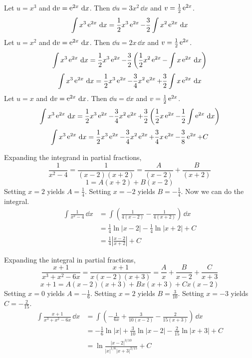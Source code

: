 \begin{Solution}
  \label{solution int x3 e2x}
  Let $u = x^3$ and $\mathrm{d} v = \mathop{\mathrm{e}}\nolimits^{2x}\,\mathrm{d} x$.  Then $\dd u = 3x^2 \,\dd x$ and
  $v = \frac{1}{2} \mathop{\mathrm{e}}\nolimits^{2x}$.
  \[
  \int x^3 \mathop{\mathrm{e}}\nolimits^{2x} \,\mathrm{d} x = \frac{1}{2} x^3 \mathop{\mathrm{e}}\nolimits^{2x} - \frac{3}{2} \int x^2 \mathop{\mathrm{e}}\nolimits^{2x}\,\mathrm{d} x
  \]
  Let $u = x^2$ and $\mathrm{d} v = \mathop{\mathrm{e}}\nolimits^{2x}\,\mathrm{d} x$.  Then $\dd u = 2x \,\dd x$ and
  $v = \frac{1}{2} \mathop{\mathrm{e}}\nolimits^{2x}$.
  \[
  \int x^3 \mathop{\mathrm{e}}\nolimits^{2x} \,\mathrm{d} x = \frac{1}{2} x^3 \mathop{\mathrm{e}}\nolimits^{2x} - \frac{3}{2} \left(
    \frac{1}{2} x^2 \mathop{\mathrm{e}}\nolimits^{2x} - \int x \mathop{\mathrm{e}}\nolimits^{2x} \,\mathrm{d} x \right)
  \]
  \[
  \int x^3 \mathop{\mathrm{e}}\nolimits^{2x} \,\mathrm{d} x = \frac{1}{2} x^3 \mathop{\mathrm{e}}\nolimits^{2x} - \frac{3}{4} x^2 \mathop{\mathrm{e}}\nolimits^{2x}
  + \frac{3}{2} \int x \mathop{\mathrm{e}}\nolimits^{2x} \,\mathrm{d} x
  \]
  Let $u = x$ and $\mathrm{d} v = \mathop{\mathrm{e}}\nolimits^{2x}\,\mathrm{d} x$.  Then $\dd u = \dd x$ and
  $v = \frac{1}{2} \mathop{\mathrm{e}}\nolimits^{2x}$.
  \[
  \int x^3 \mathop{\mathrm{e}}\nolimits^{2x} \,\mathrm{d} x = \frac{1}{2} x^3 \mathop{\mathrm{e}}\nolimits^{2x} - \frac{3}{4} x^2 \mathop{\mathrm{e}}\nolimits^{2x}
  + \frac{3}{2} \left( \frac{1}{2} x \mathop{\mathrm{e}}\nolimits^{2x} - \frac{1}{2}
    \int \mathop{\mathrm{e}}\nolimits^{2x} \,\mathrm{d} x \right)
  \]
  \[
  \int x^3 \mathop{\mathrm{e}}\nolimits^{2x} \,\mathrm{d} x = \frac{1}{2} x^3 \mathop{\mathrm{e}}\nolimits^{2x} - \frac{3}{4} x^2 \mathop{\mathrm{e}}\nolimits^{2x}
  + \frac{3}{4} x \mathop{\mathrm{e}}\nolimits^{2x} - \frac{3}{8} \mathop{\mathrm{e}}\nolimits^{2x} + C
  \]
\end{Solution}





\begin{Solution}
  \label{solution int 1 / x2-4}
  Expanding the integrand in partial fractions,
  \[
  \frac{1}{x^2-4} = \frac{1}{(x-2)(x+2)} = \frac{A}{(x-2)} + \frac{B}{(x+2)}
  \]
  \[
  1 = A (x+2) + B (x-2)
  \]
  Setting $x=2$ yields $A = \frac{1}{4}$.  Setting $x=-2$ yields
  $B = -\frac{1}{4}$.
  Now we can do the integral.
  \begin{align*}
    \int \frac{1}{x^2-4}\,\dd x
    &= \int \left(\frac{1}{4(x-2)} - \frac{1}{4(x+2)} \right)\,\dd x \\
    &= \frac{1}{4} \ln |x-2| - \frac{1}{4} \ln |x+2| + C \\
    &= \frac{1}{4} \left| \frac{x-2}{x+2} \right| + C
  \end{align*}
\end{Solution}




\begin{Solution}
  \label{solution int x+1 / x3+x2-6x}
  Expanding the integral in partial fractions,
  \[
  \frac{x+1}{x^3+x^2-6x} = \frac{x+1}{x(x-2)(x+3)}
  = \frac{A}{x} + \frac{B}{x-2} + \frac{C}{x+3}
  \]
  \[
  x+1 = A (x-2)(x+3) + B x(x+3) + C x(x-2)
  \]
  Setting $x=0$ yields $A = -\frac{1}{6}$.
  Setting $x=2$ yields $B = \frac{3}{10}$.
  Setting $x=-3$ yields $C = -\frac{2}{15}$.
  \begin{align*}
    \int \frac{x+1}{x^3+x^2-6x} \,\dd x
    &= \int \left( - \frac{1}{6x} + \frac{3}{10(x-2)} - \frac{2}{15(x+3)}
    \right) \,\dd x \\
    &= -\frac{1}{6} \ln |x| + \frac{3}{10} \ln |x-2|
    - \frac{2}{15} \ln |x+3| + C \\
    &= \ln \frac{|x-2|^{3/10}}{|x|^{1/6} |x+3|^{2/15}} + C
  \end{align*}
\end{Solution}





